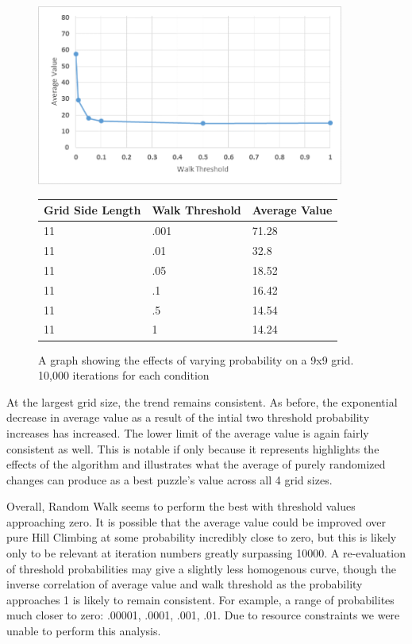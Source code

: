 \documentclass[12pt]{article}
\begin{document}
 \begin{figure}[H]
    \centering
    \includegraphics[width=0.9\textwidth]{9x9_RWprob}
\begin{tabular}{ |p{4cm}||p{4cm}|p{4cm}|  }
 \hline
Grid Side Length&Walk Threshold&Average Value\\
 \hline
11&.001&71.28\\
11&.01&32.8\\
11&.05&18.52\\
11&.1&16.42\\
11&.5&14.54\\
11&1&14.24\\
 \hline
\end{tabular}
    \caption{A graph showing the effects of varying probability on a 9x9 grid. 10,000 iterations for each condition}
    \label{fig:RWprob9x9}
\end{figure}

At the largest grid size, the trend remains consistent. As before, the exponential decrease in average value as a result of the intial two threshold probability increases has increased. The lower limit of the average value is again fairly consistent as well. This is notable if only because it represents highlights the effects of the algorithm and illustrates what the average of purely randomized changes can produce as a best puzzle's value across all 4 grid sizes. \newline

Overall, Random Walk seems to perform the best with threshold values approaching zero. It is possible that the average value could be improved over pure Hill Climbing at some probability incredibly close to zero, but this is likely only to be relevant at iteration numbers greatly surpassing 10000. A re-evaluation of threshold probabilities may give a slightly less homogenous curve, though the inverse correlation of average value and walk threshold as the probability approaches 1 is likely to remain consistent. For example, a range of probabilites much closer to zero: .00001, .0001, .001, .01. Due to resource constraints we were unable to perform this analysis.
\end{document}
